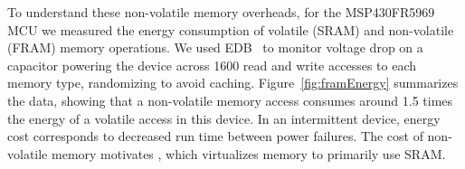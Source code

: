 
To understand these non-volatile memory overheads, for the MSP430FR5969~\cite{msp430datasheet} MCU we measured the energy consumption of volatile (SRAM) and non-volatile (FRAM) memory operations. We used EDB~\cite{edb} to monitor voltage drop on a capacitor powering the device across 1600 read and write accesses to each memory type, randomizing to avoid caching. Figure~\ref{fig:framEnergy} summarizes the data, showing that a non-volatile memory access consumes around 1.5 times the energy of a volatile access in this device. In an intermittent device, energy cost corresponds to decreased run time between power failures. The cost of non-volatile memory motivates \sys, which virtualizes memory to primarily use SRAM.



